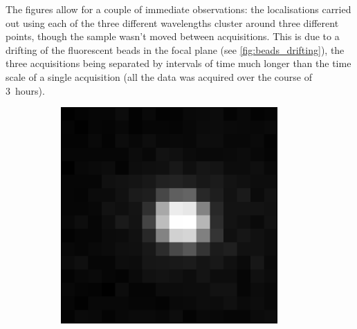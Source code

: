 %
The figures allow for a couple of immediate observations:
the localisations carried out using each of the three different wavelengths cluster around three different points, though the sample wasn't moved between acquisitions.
This is due to a drifting of the fluorescent beads in the focal plane (see \autoref{fig:beads_drifting}), the three acquisitions being separated by intervals of time much longer than the time scale of a single acquisition (all the data was acquired over the course of \mbox{3 hours}).
%
\begin{figure}
    \centering
    \begin{subfigure}{0.32\textwidth}
        \includegraphics[width=\textwidth]{figures/beads_drifting_647nm.pdf}
        \caption{}
        \label{fig:beads_drifting_647nm}
    \end{subfigure}
    \begin{subfigure}{0.32\textwidth}

\end{subfigure}
\end{figure}
